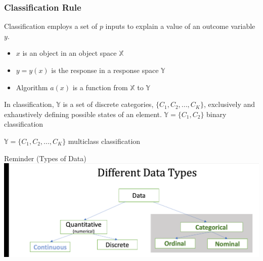 \documentclass[compress]{beamer}
\begin{document}
\begin{frame}
	\frametitle{Classification Rule}
	
	Classification employs a set of $p$ inputs to explain a value of an outcome 
	variable $y$.
		\vspace{0.2cm}
	\begin{itemize}
		\item $x$ is an object in an object space $\mathbb{X}$	
		\vspace{0.2cm}
		\item $y = y(x)$ is the response in a response space $\mathbb{Y}$
			\vspace{0.2cm}
		\item Algorithm $a(x)$ is a function from $\mathbb{X}$ to $\mathbb{Y}$
	\end{itemize}
	
	
	
	
	
	
	
	\vspace{0.3cm}
	
	In classification, $\mathbb{Y}$ is a set of discrete categories, $\{C_1, C_2, 
	..., 
	C_K\}$, exclusively and exhaustively defining possible states of an element.
		\vspace{0.2cm}
	$\mathbb{Y} = \{C_1, C_2\}$ binary classification
	
	$\mathbb{Y} = \{C_1, C_2, ..., C_K\}$ multiclass classification
	
\end{frame}


\begin{frame}

\end{frame}


\begin{frame}{Reminder (Types of Data)}
\includegraphics[scale=.25]{typesOFdata1.png} 
\end{frame}
\end{document}
